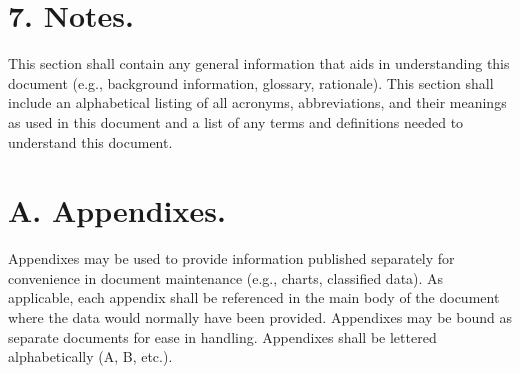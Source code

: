 \section{7. Notes.}

This section shall contain any general information that aids in
understanding this document (e.g., background information, glossary,
rationale). This section shall include an alphabetical listing of all
acronyms, abbreviations, and their meanings as used in this document and
a list of any terms and definitions needed to understand this document.

\section{A. Appendixes.}

Appendixes may be used to provide information published separately for
convenience in document maintenance (e.g., charts, classified data). As
applicable, each appendix shall be referenced in the main body of the
document where the data would normally have been provided. Appendixes
may be bound as separate documents for ease in handling. Appendixes
shall be lettered alphabetically (A, B, etc.).
